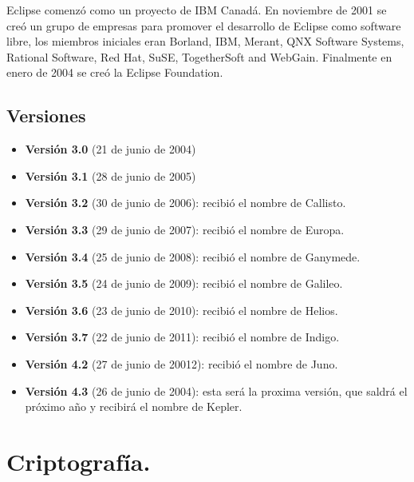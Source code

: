 Eclipse comenzó como un proyecto de IBM Canadá. En noviembre de 2001 se creó un grupo de empresas para promover el desarrollo de Eclipse como software libre, los miembros iniciales eran Borland, IBM, Merant, QNX Software Systems, Rational Software, Red Hat, SuSE, TogetherSoft and WebGain. Finalmente en enero de 2004 se creó la Eclipse Foundation. 

\subsection{Versiones}

\begin{itemize}

	\item \textbf{Versión 3.0} (21 de junio de 2004)
	
	\item \textbf{Versión 3.1} (28 de junio de 2005)
	
	\item \textbf{Versión 3.2} (30 de junio de 2006): recibió el nombre de Callisto.
	
	\item \textbf{Versión 3.3} (29 de junio de 2007): recibió el nombre de Europa.
	
	\item \textbf{Versión 3.4} (25 de junio de 2008): recibió el nombre de Ganymede.
	
	\item \textbf{Versión 3.5} (24 de junio de 2009): recibió el nombre de Galileo.
	
	\item \textbf{Versión 3.6} (23 de junio de 2010): recibió el nombre de Helios.
	
	\item \textbf{Versión 3.7} (22 de junio de 2011): recibió el nombre de Indigo.
	
	\item \textbf{Versión 4.2} (27 de junio de 20012): recibió el nombre de Juno.
	
	\item \textbf{Versión 4.3} (26 de junio de 2004): esta será la proxima versión, que saldrá el próximo año y recibirá el nombre de Kepler.

\end{itemize}

\section{Criptografía.}

